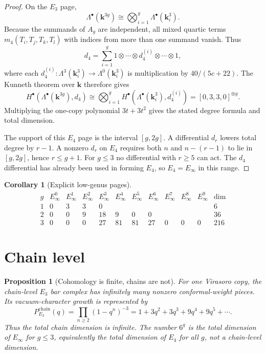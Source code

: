\documentclass[11pt]{amsart}
\newtheorem{proposition}[theorem]{Proposition}
\newtheorem{corollary}[theorem]{Corollary}
\theoremstyle{definition}
\providecommand{\kk}{\mathbf{k}}
\providecommand{\Lam}{\Lambda}
\begin{document}
\begin{proof}
On the \(E_3\) page,
\[
  \Lam^\bullet(\kk^{3g})
  \cong
  \bigotimes_{i=1}^g \Lam^\bullet(\kk_i^3).
\]
Because the summands of \(A_g\) are independent, all mixed quartic
terms \(m_4(T_i,T_j,T_k,T_l)\) with indices from more than one
summand vanish. Thus
\[
  d_4=\sum_{i=1}^g
  1\otimes\cdots\otimes d_4^{(i)}\otimes\cdots\otimes1,
\]
where each \(d_4^{(i)}:\Lam^3(\kk_i^3)\to\Lam^0(\kk_i^3)\) is
multiplication by \(40/(5c+22)\). The Kunneth theorem over \(\kk\)
therefore gives
\[
  H^\bullet(\Lam^\bullet(\kk^{3g}),d_4)
  \cong
  \bigotimes_{i=1}^g
  H^\bullet(\Lam^\bullet(\kk_i^3),d_4^{(i)})
  =
  [0,3,3,0]^{\otimes g}.
\]
Multiplying the one-copy polynomial \(3t+3t^2\) gives the stated
degree formula and total dimension.

The support of this \(E_4\) page is the interval \([g,2g]\). A
differential \(d_r\) lowers total degree by \(r-1\). A nonzero
\(d_r\) on \(E_4\) requires both \(n\) and \(n-(r-1)\) to lie in
\([g,2g]\), hence \(r\leq g+1\). For \(g\leq3\) no differential with
\(r\geq5\) can act. The \(d_4\) differential has already been used in
forming \(E_4\), so \(E_4=E_\infty\) in this range.
\end{proof}

\begin{corollary}[Explicit low-genus pages]
\[
\begin{array}{c|ccccccccccc|c}
g & E_\infty^0 & E_\infty^1 & E_\infty^2 & E_\infty^3
  & E_\infty^4 & E_\infty^5 & E_\infty^6
  & E_\infty^7 & E_\infty^8 & E_\infty^9 & \dim\\
\hline
1 & 0 & 3 & 3 & 0 & & & & & & & 6\\
2 & 0 & 0 & 9 & 18 & 9 & 0 & 0 & & & & 36\\
3 & 0 & 0 & 0 & 27 & 81 & 81 & 27 & 0 & 0 & 0 & 216
\end{array}
\]
\end{corollary}

\section{Chain level}

\begin{proposition}[Cohomology is finite, chains are not]
\label{prop:chain-level}
For one Virasoro copy, the chain-level \(E_3\) bar complex has
infinitely many nonzero conformal-weight pieces. Its vacuum-character
growth is represented by
\[
  P_{E_3}^{\mathrm{chain}}(q)
  =
  \prod_{n\geq2}(1-q^n)^{-3}
  =
  1+3q^2+3q^3+9q^4+9q^5+\cdots .
\]
Thus the total chain dimension is infinite. The number \(6^g\) is the
total dimension of \(E_\infty\) for \(g\leq3\), equivalently the
total dimension of \(E_4\) for all \(g\), not a chain-level dimension.
\end{proposition}
\end{document}

